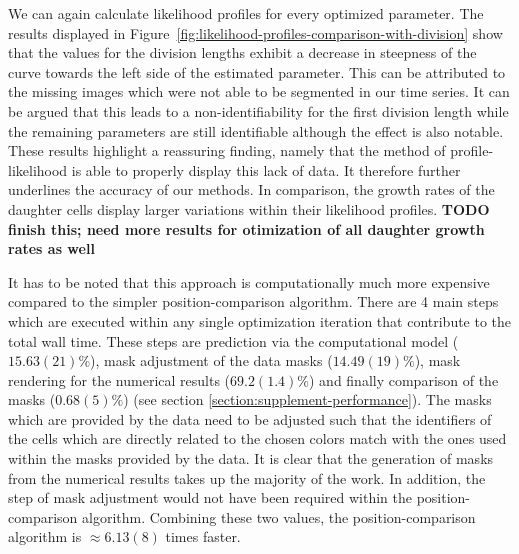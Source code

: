 \documentclass{article}
\begin{document}
We can again calculate likelihood profiles for every optimized parameter.
The results displayed in Figure~\ref{fig:likelihood-profiles-comparison-with-division} show that the
values for the division lengths exhibit a decrease in steepness of the curve towards the left side
of the estimated parameter.
This can be attributed to the missing images which were not able to be segmented in our time series.
It can be argued that this leads to a non-identifiability for the first division length while the
remaining parameters are still identifiable although the effect is also notable.
These results highlight a reassuring finding, namely that the method of profile-likelihood is able
to properly display this lack of data.
It therefore further underlines the accuracy of our methods.
In comparison, the growth rates of the daughter cells display larger variations within their
likelihood profiles.
\textbf{TODO finish this; need more results for otimization of all daughter growth rates as well}

It has to be noted that this approach is computationally much more expensive compared to the simpler
position-comparison algorithm.
There are 4 main steps which are executed within any single optimization iteration that contribute
to the total wall time.
These steps are prediction via the computational model ($15.63(21)\%$), mask adjustment of the data
masks ($14.49(19)\%$), mask rendering for the numerical results ($69.2(1.4)\%$) and finally
comparison of the masks ($0.68(5)\%$) (see section \ref{section:supplement-performance}).
The masks which are provided by the data need to be adjusted such that the identifiers of the cells
which are directly related to the chosen colors match with the ones used within the masks provided
by the data.
It is clear that the generation of masks from the numerical results takes up the majority of the
work.
In addition, the step of mask adjustment would not have been required within the position-comparison
algorithm.
Combining these two values, the position-comparison algorithm is $\approx 6.13(8)$ times faster.
\end{document}
